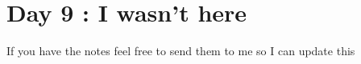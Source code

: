 \section{Day 9 : I wasn't here}

If you have the notes feel free to send them to me so I can update this